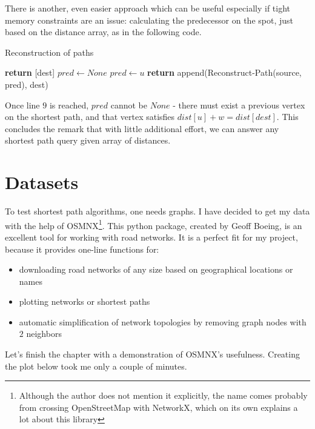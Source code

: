 \documentclass[12pt,a4paper,twoside,openright]{report}
\begin{document}
There is another, even easier approach which can be useful especially if tight memory constraints are an issue: calculating the predecessor on the spot, just based on the distance array, as in the following code.

\begin{algorithm}
\caption{Reconstruction of paths}\label{pathrec}
\begin{algorithmic}[1]
\State \textbf{return} [dest]
\Else
    \State $pred \gets None$
    \State $pred \gets u$
    \EndIf
    \EndFor
    \State \textbf{return} append(Reconstruct-Path(source, pred), dest)
\EndIf
\EndProcedure
\end{algorithmic}
\end{algorithm}

Once line $9$ is reached, $pred$ cannot be $None$ - there must exist a previous vertex on the shortest path, and that vertex satisfies $dist[u] + w = dist[dest]$. This concludes the remark that with little additional effort, we can answer any shortest path query given array of distances.

\section{Datasets}
To test shortest path algorithms, one needs graphs. I have decided to get my data with the help of OSMNX\cite{Boeing2017}\footnote{Although the author does not mention it explicitly, the name comes probably from crossing OpenStreetMap with NetworkX, which on its own explains a lot about this library}. This python package, created by Geoff Boeing, is an excellent tool for working with road networks. It is a perfect fit for my project, because it provides one-line functions for:
\begin{itemize}
    \item downloading road networks of any size based on geographical locations or names
    \item plotting networks or shortest paths
    \item automatic simplification of network topologies by removing graph nodes with $2$ neighbors
\end{itemize} 

Let's finish the chapter with a demonstration of OSMNX's usefulness. Creating the plot below took me only a couple of minutes.
\end{document}

